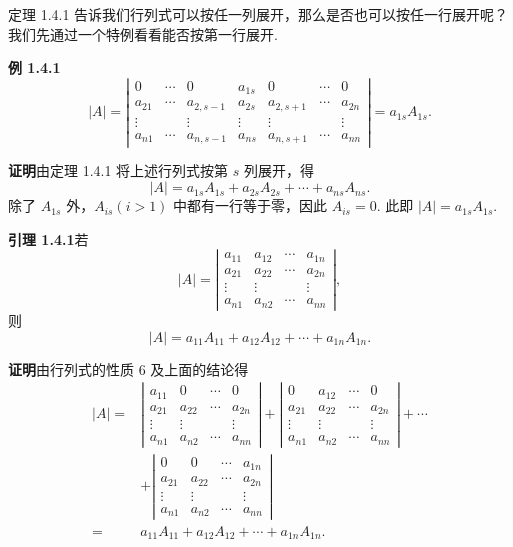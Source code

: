 \documentclass[UTF8, 12pt, fontset=fandol, oneside]{ctexart}
\begin{document}
定理 1.4.1 告诉我们行列式可以按任一列展开，那么是否也可以按任一行展开呢？我们先通过一个特例看看能否按第一行展开.

\noindent\textbf{例 1.4.1}\quad
\[
|A|=
\left|\begin{array}{ccccccc}
0 & \cdots & 0 & a_{1s} & 0 & \cdots & 0\\
a_{21} & \cdots & a_{2,s-1} & a_{2s} & a_{2,s+1} & \cdots & a_{2n}\\
\vdots & & \vdots & \vdots & \vdots & & \vdots\\
a_{n1} & \cdots & a_{n,s-1} & a_{ns} & a_{n,s+1} & \cdots & a_{nn}
\end{array}\right|
=a_{1s}A_{1s}.
\]

\noindent\textbf{证明}\quad 由定理 1.4.1 将上述行列式按第 $s$ 列展开，得
\[
|A|=a_{1s}A_{1s}+a_{2s}A_{2s}+\cdots+a_{ns}A_{ns}.
\]
除了 $A_{1s}$ 外，$A_{is}(i>1)$ 中都有一行等于零，因此 $A_{is}=0$. 此即 $|A|=a_{1s}A_{1s}$.

\noindent\textbf{引理 1.4.1}\quad 若
\begin{equation}
|A|=
\left|\begin{array}{cccc}
a_{11} & a_{12} & \cdots & a_{1n}\\
a_{21} & a_{22} & \cdots & a_{2n}\\
\vdots & \vdots & & \vdots\\
a_{n1} & a_{n2} & \cdots & a_{nn}
\end{array}\right|,
\tag{1.4.5}
\end{equation}
则
\[
|A|=a_{11}A_{11}+a_{12}A_{12}+\cdots+a_{1n}A_{1n}.
\]

\noindent\textbf{证明}\quad 由行列式的性质 6 及上面的结论得
\[
\begin{aligned}
|A|={}&
\left|\begin{array}{cccc}
a_{11} & 0 & \cdots & 0\\
a_{21} & a_{22} & \cdots & a_{2n}\\
\vdots & \vdots & & \vdots\\
a_{n1} & a_{n2} & \cdots & a_{nn}
\end{array}\right|
+
\left|\begin{array}{cccc}
0 & a_{12} & \cdots & 0\\
a_{21} & a_{22} & \cdots & a_{2n}\\
\vdots & \vdots & & \vdots\\
a_{n1} & a_{n2} & \cdots & a_{nn}
\end{array}\right|+\cdots\\
&+
\left|\begin{array}{cccc}
0 & 0 & \cdots & a_{1n}\\
a_{21} & a_{22} & \cdots & a_{2n}\\
\vdots & \vdots & & \vdots\\
a_{n1} & a_{n2} & \cdots & a_{nn}
\end{array}\right|\\
={}&a_{11}A_{11}+a_{12}A_{12}+\cdots+a_{1n}A_{1n}.
\end{aligned}
\]
\end{document}
